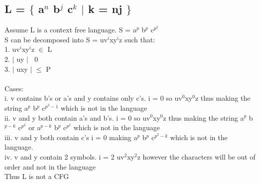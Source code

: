 \documentclass[10pt,letterpaper]{article}
\begin{document}
\subsection*{L = $\lbrace$ a$^{n}$ b$^{j}$ c$^{k}$ $\mid$ k = nj $\rbrace$}
	Assume L is a context free language. S = a$^{p}$ b$^{p}$ c$^{p^{2}}$\\
	S can be decomposed into S = uv$^{i}$xy$^{i}$z such that:\\
	1. uv$^{i}$xy$^{i}$z $\in$ L\\
	2. $\mid$ uy $\mid$ $\>$ 0 \\
	3. $\mid$ uxy $\mid$ $\leq$ P\\
	\\
	Cases:\\
	i. v contains b's or a's and y contains only c's. i = 0 so uv$^{0}$xy$^{0}$z 	thus making the string a$^{p}$ b$^{p}$ c$^{p^{2}-1}$ which is not in the language\\
	ii. v and y both contain a's and b's. i = 0 so uv$^{0}$xy$^{0}$z thus making the string a$^{p}$ b$^{p-k}$ c$^{p^{2}}$ or  a$^{p-k}$ b$^{p}$ c$^{p^{2}}$ which is not in the 		language\\ 
	iii. v and y both contain c's i = 0 making a$^{p}$ b$^{p}$ c$^{p^{2}-k}$ which is not in the language.\\
	iv. v and y contain 2 symbols. i = 2 uv$^{2}$xy$^{2}$z however the characters will be out of order and not in the language\\
	Thus L is not a CFG
\end{document}
